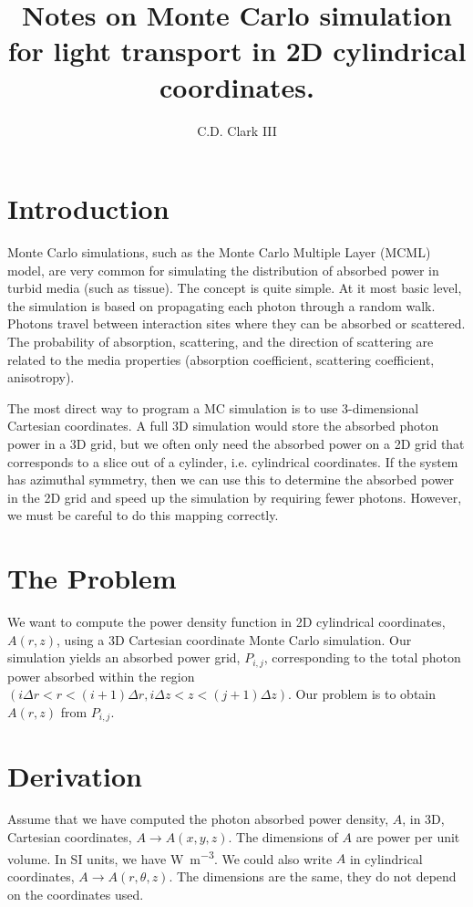 \documentclass[letterpaper,12pt]{article}
\title{Notes on Monte Carlo simulation for light transport in 2D cylindrical coordinates.}
\author{C.D. Clark III}
\begin{document}
\maketitle

\section{Introduction}
Monte Carlo simulations, such as the Monte Carlo Multiple Layer (MCML) model, are very common for simulating the distribution of absorbed power in turbid media (such as tissue).
The concept is quite simple. At it most basic level, the simulation is based on propagating each photon through a random walk. Photons travel between interaction sites where they can
be absorbed or scattered. The probability of absorption, scattering, and the direction of scattering are related to the media properties (absorption coefficient, scattering coefficient, anisotropy).

The most direct way to program a MC simulation is to use 3-dimensional Cartesian coordinates. A full 3D simulation would store the absorbed photon power in a 3D grid, but we often only need the absorbed
power on a 2D grid that corresponds to a slice out of a cylinder, i.e. cylindrical coordinates. If the system has azimuthal symmetry, then we can use this to determine the absorbed power in the 2D grid and speed
up the simulation by requiring fewer photons. However, we must be careful to do this mapping correctly.

\section{The Problem}
We want to compute the power density function in 2D cylindrical coordinates, $A(r,z)$, using a 3D Cartesian coordinate Monte Carlo simulation. Our simulation yields an absorbed power grid, $P_{i,j}$, corresponding
to the total photon power absorbed within the region $( i\Delta r < r < (i+1)\Delta r, i\Delta z < z < (j+1)\Delta z)$. Our problem is to obtain $A(r,z)$ from $P_{i,j}$.

\section{Derivation}

Assume that we have computed the photon absorbed power density, $A$, in 3D, Cartesian coordinates, $A \rightarrow A(x,y,z)$. The dimensions of $A$ are power per unit volume. In SI units, we have \si{\watt\per\meter\cubed}.
We could also write $A$ in cylindrical coordinates, $A \rightarrow A(r,\theta,z)$. The dimensions are the same, they do not depend on the coordinates used.
\end{document}
